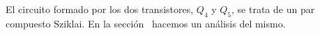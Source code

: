 
\vspace{1.5cm}



El circuito formado por los dos transistores, $Q_{4}$ y $Q_{5}$, se trata de un par compuesto Sziklai. En la sección~ hacemos un análisis del mismo.\\


\clearpage


